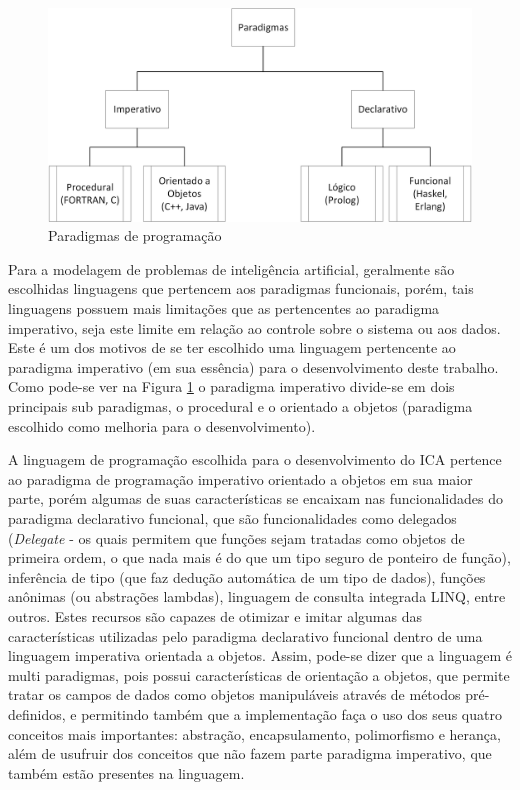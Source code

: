 \begin{figure}[h]
	\centering	
	\includegraphics[scale=0.7]{Figuras/Ilustrations-Paradigms.png}
	\caption{Paradigmas de programação}
	\label{fig:Ilustrations-Paradigms}
	\end{figure}


Para a modelagem de problemas de inteligência artificial, geralmente são escolhidas linguagens que pertencem aos paradigmas funcionais, porém, tais linguagens possuem mais limitações que as pertencentes ao paradigma imperativo, seja este limite em relação ao controle sobre o sistema ou aos dados. Este é um dos motivos de se ter escolhido uma linguagem pertencente ao paradigma imperativo (em sua essência) para o desenvolvimento deste trabalho. Como pode-se ver na Figura \ref{fig:Ilustrations-Paradigms} o paradigma imperativo divide-se em dois principais sub paradigmas, o procedural e o orientado a objetos (paradigma escolhido como melhoria para o desenvolvimento). 

A linguagem de programação escolhida para o desenvolvimento do ICA pertence ao paradigma de programação imperativo orientado a objetos em sua maior parte, porém algumas de suas características se encaixam nas funcionalidades do paradigma declarativo funcional, que são funcionalidades como delegados (\emph{Delegate} - os quais permitem que funções sejam tratadas como objetos de primeira ordem, o que nada mais é do que um tipo seguro de ponteiro de função), inferência de tipo (que faz dedução automática de um tipo de dados), funções anônimas (ou abstrações lambdas), linguagem de consulta integrada LINQ, entre outros. Estes recursos são capazes de otimizar e imitar algumas das características utilizadas pelo paradigma declarativo funcional dentro de uma linguagem imperativa orientada a objetos. Assim, pode-se dizer que a linguagem é multi paradigmas, pois possui características de orientação a objetos, que permite tratar os campos de dados como objetos manipuláveis através de métodos pré-definidos, e permitindo também que a implementação faça o uso dos seus quatro conceitos mais importantes: abstração, encapsulamento, polimorfismo e herança, além de usufruir dos conceitos que não fazem parte paradigma imperativo, que também estão presentes na linguagem. 

